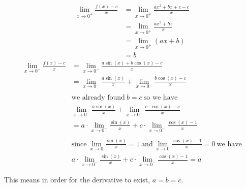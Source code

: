 \documentclass[nooutcomes]{ximera}
\begin{document}
\begin{problem}
\begin{freeResponse}
		\begin{align*}
		\lim_{x\to 0^+} \frac{f(x)-c}{x}&=\lim_{x\to 0^+} \frac{ax^2+bx+c-c}{x}\\
		&=\lim_{x\to 0^+} \frac{ax^2+bx}{x}\\
		&=\lim_{x\to 0^+} (ax+b)\\
		&=b
		\end{align*}
		\begin{align*}
		\lim_{x\to 0^-} \frac{f(x)-c}{x}&=\lim_{x\to 0^-} \frac{a \sin(x)+b \cos(x)-c}{x}\\
		&=\lim_{x\to 0^-} \frac{a \sin(x)}{x}+\lim_{x\to 0^-} \frac{b\cos(x)-c}{x}\\ \\
		& \text{we already found}\ b=c \ \text{so we have}\\
		&\lim_{x\to 0^-} \frac{a \sin(x)}{x}+\lim_{x\to 0^-} \frac{c\cdot \cos(x)-c}{x}\\
		&=a\cdot \lim_{x\to 0^-} \frac{ \sin(x)}{x}+c \cdot \lim_{x\to 0^-} \frac{\cos(x)-1}{x}\\ \\
		& \text{since}\ \lim_{x\to 0} \frac{\sin(x)}{x}=1\ \text{and}\  \lim_{x\to 0} \frac{\cos(x)-1}{x}=0 \ \text{we have}\\
		&a\cdot \lim_{x\to 0^-} \frac{\sin(x)}{x}+c \cdot \lim_{x\to 0^-} \frac{\cos(x)-1}{x}=a
		\end{align*}

		This means in order for the derivative to exist, $a=b=c$.
		\end{freeResponse}
\end{problem}	
\end{document}
